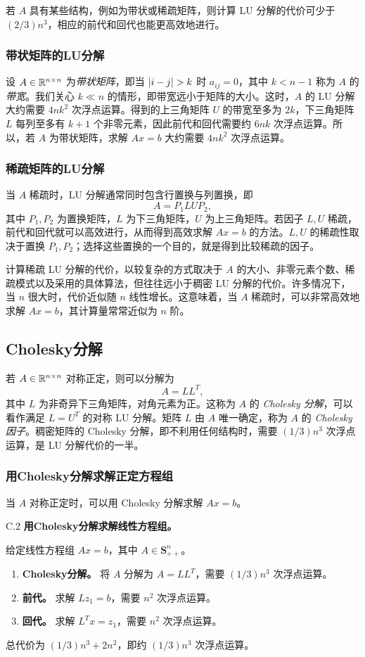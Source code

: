 若 $A$ 具有某些结构，例如为带状或稀疏矩阵，则计算 LU 分解的代价可少于 $(2/3)n^3$，相应的前代和回代也能更高效地进行。

\subsubsection*{带状矩阵的LU分解}
设 $A\in\mathbb R^{n\times n}$ 为\emph{带状矩阵}，即当 $\left\lvert i-j\right\rvert>k$ 时 $a_{ij}=0$，其中 $k<n-1$ 称为 $A$ 的\emph{带宽}。我们关心 $k\ll n$ 的情形，即带宽远小于矩阵的大小。这时，$A$ 的 LU 分解大约需要 $4nk^2$ 次浮点运算。得到的上三角矩阵 $U$ 的带宽至多为 $2k$，下三角矩阵 $L$ 每列至多有 $k+1$ 个非零元素，因此前代和回代需要约 $6nk$ 次浮点运算。所以，若 $A$ 为带状矩阵，求解 $Ax=b$ 大约需要 $4nk^2$ 次浮点运算。

\subsubsection*{稀疏矩阵的LU分解}
当 $A$ 稀疏时，LU 分解通常同时包含行置换与列置换，即
\[
 A=P_1LUP_2,
\]
其中 $P_1,P_2$ 为置换矩阵，$L$ 为下三角矩阵，$U$ 为上三角矩阵。若因子 $L,U$ 稀疏，前代和回代就可以高效进行，从而得到高效求解 $Ax=b$ 的方法。$L,U$ 的稀疏性取决于置换 $P_1,P_2$；选择这些置换的一个目的，就是得到比较稀疏的因子。

计算稀疏 LU 分解的代价，以较复杂的方式取决于 $A$ 的大小、非零元素个数、稀疏模式以及采用的具体算法，但往往远小于稠密 LU 分解的代价。许多情况下，当 $n$ 很大时，代价近似随 $n$ 线性增长。这意味着，当 $A$ 稀疏时，可以非常高效地求解 $Ax=b$，其计算量常常近似为 $n$ 阶。

\subsection{Cholesky分解}
若 $A\in\mathbb R^{n\times n}$ 对称正定，则可以分解为
\[
 A=LL^T,
\]
其中 $L$ 为非奇异下三角矩阵，对角元素为正。这称为 $A$ 的 \emph{Cholesky 分解}，可以看作满足 $L=U^T$ 的对称 LU 分解。矩阵 $L$ 由 $A$ 唯一确定，称为 $A$ 的 \emph{Cholesky 因子}。稠密矩阵的 Cholesky 分解，即不利用任何结构时，需要 $(1/3)n^3$ 次浮点运算，是 LU 分解代价的一半。

\subsubsection*{用Cholesky分解求解正定方程组}
当 $A$ 对称正定时，可以用 Cholesky 分解求解 $Ax=b$。

\begin{origalgorithm}{C.2}
\textbf{用Cholesky分解求解线性方程组。}

给定线性方程组 $Ax=b$，其中 $A\in\mathbf S_{++}^n$。
\begin{enumerate}
\item \textbf{Cholesky分解。} 将 $A$ 分解为 $A=LL^T$，需要 $(1/3)n^3$ 次浮点运算。
\item \textbf{前代。} 求解 $Lz_1=b$，需要 $n^2$ 次浮点运算。
\item \textbf{回代。} 求解 $L^Tx=z_1$，需要 $n^2$ 次浮点运算。
\end{enumerate}
\end{origalgorithm}
总代价为 $(1/3)n^3+2n^2$，即约 $(1/3)n^3$ 次浮点运算。

